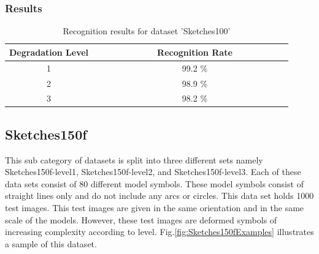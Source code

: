 \subsubsection{Results}
\begin{table}[H]
\centering
\caption{Recognition results for dataset 'Sketches100'}
\begin{tabular}{ccccccccccccccc}
  \hline
     Degradation Level & & & & & & & & Recognition Rate \\
  \hline
     1 & & & & & & & &  99.2 \% \\
     2 & & & & & & & &  98.9 \% \\
     3 & & & & & & & &  98.2 \% \\

  \hline
\end{tabular}
\end{table}

\vspace{49.3mm}

\subsection{Sketches150f}
This sub category of datasets is split into three different sets namely Sketches150f-level1, Sketches150f-level2, and Sketches150f-level3. Each of these data sets consist of 80 different model symbols. These model symbols consist of straight lines only and do not include any arcs or circles. This data set holds 1000 test images. This test images are given in the same orientation and in the same scale of the models. However, these test images are deformed symbols of increasing complexity according to level. Fig.\ref{fig:Sketches150fExamples} illustrates a sample of this dataset.

